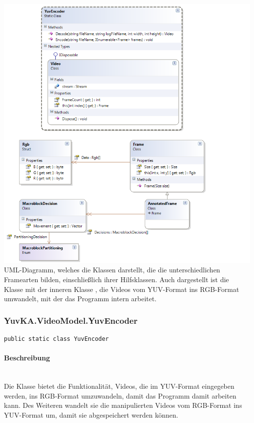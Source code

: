 \includegraphics[width=\textwidth]{YuvKA.VideoModel/videomodel.png}
UML-Diagramm, welches die Klassen darstellt, die die unterschiedlichen Framearten bilden, einschließlich ihrer Hilfsklassen. Auch dargestellt ist die Klasse  mit der inneren Klasse , die Videos vom YUV-Format ins RGB-Format umwandelt, mit der das Programm intern arbeitet.

\subsubsection{YuvKA.VideoModel.YuvEncoder}

\begin{verbatim}
public static class YuvEncoder
\end{verbatim}

\paragraph{Beschreibung}~\\
Die Klasse  bietet die Funktionalität, Videos, die im YUV-Format eingegeben werden, ins RGB-Format umzuwandeln, damit das Programm damit arbeiten kann. Des Weiteren wandelt sie die manipulierten Videos vom RGB-Format ins YUV-Format um, damit sie abgespeichert werden können.

